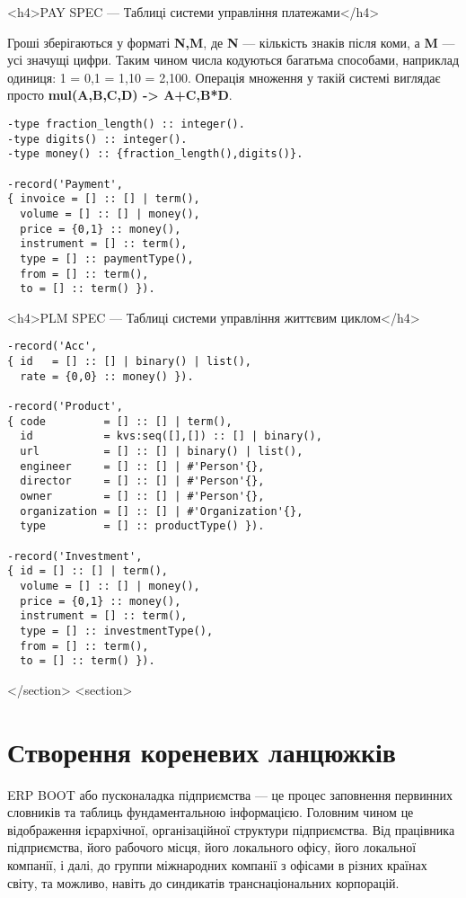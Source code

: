         <h4>PAY SPEC — Таблиці системи управління платежами</h4>

        Гроші зберігаються у форматі \textbf{{N,M}}, де \textbf{N} — кількість знаків після коми,
           а \textbf{M} — усі значущі цифри. Таким чином числа кодуються багатьма способами,
           наприклад одиниця: 1 = {0,1} = {1,10} = {2,100}. Операція множення у такій системі
           виглядає просто \textbf{mul({A,B},{C,D}) -> {A+C,B*D}}.
           

   \begin{lstlisting}
-type fraction_length() :: integer().
-type digits() :: integer().
-type money() :: {fraction_length(),digits()}.

-record('Payment',
{ invoice = [] :: [] | term(),
  volume = [] :: [] | money(),
  price = {0,1} :: money(),
  instrument = [] :: term(),
  type = [] :: paymentType(),
  from = [] :: term(),
  to = [] :: term() }).
    \end{lstlisting}

        <h4>PLM SPEC — Таблиці системи управління життєвим циклом</h4>

   \begin{lstlisting}
-record('Acc',
{ id   = [] :: [] | binary() | list(),
  rate = {0,0} :: money() }).

-record('Product',
{ code         = [] :: [] | term(),
  id           = kvs:seq([],[]) :: [] | binary(),
  url          = [] :: [] | binary() | list(),
  engineer     = [] :: [] | #'Person'{},
  director     = [] :: [] | #'Person'{},
  owner        = [] :: [] | #'Person'{},
  organization = [] :: [] | #'Organization'{},
  type         = [] :: productType() }).

-record('Investment',
{ id = [] :: [] | term(),
  volume = [] :: [] | money(),
  price = {0,1} :: money(),
  instrument = [] :: term(),
  type = [] :: investmentType(),
  from = [] :: term(),
  to = [] :: term() }).
    \end{lstlisting}

    </section>
    <section>
        \section{Створення кореневих ланцюжків}

        ERP BOOT або пусконаладка підприємства — це процес заповнення первинних
           словників та таблиць фундаментальною інформацією. Головним чином це відображення
           ієрархічної, організаційної структури підприємства.
           Від працівника підприємства, його рабочого місця,
           його локального офісу, його локальної компанії, і далі, до
           группи міжнародних компанії з офісами в різних країнах світу,
           та можливо, навіть до синдикатів транснаціональних корпорацій.

